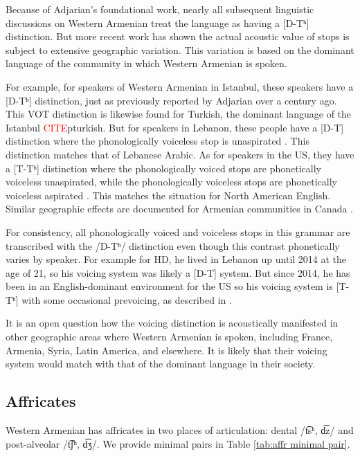 	Because of Adjarian's foundational work, nearly all subsequent linguistic discussions on Western Armenian treat the language as having a [D-Tʰ] distinction. But more recent work has shown the actual acoustic value of stops is subject to extensive geographic variation. This variation is based on the dominant language of the community in which Western Armenian is spoken. 
	
	For example, for speakers of Western Armenian in Istanbul, these speakers have a [D-Tʰ] distinction, just as previously reported by Adjarian over a century ago. This VOT distinction is likewise found for Turkish, the dominant language of the Istanbul \textcolor{red}{CITE}p{turkish}. But for speakers in Lebanon, these people have a [D-T] distinction where the phonologically voiceless stop is unaspirated \citep{kellyKeshishian-2019-voicingStopsAffricatesArmenianLebanon}. This distinction matches that of Lebanese Arabic. As for speakers in the US, they have a [T-Tʰ] distinction where the phonologically voiced stops are phonetically voiceless unaspirated, while the phonologically voiceless stops are phonetically voiceless aspirated \citep{kellyKeshishian-2021-VoicingWesternArmenian}. This matches the situation for North American English. Similar geographic effects are documented for Armenian communities in Canada \citep{Tahtadjian-2021-PhoneticInterferenceProductionStopsWesternArmenianBilingual}. 
	
	For consistency, all phonologically voiced and voiceless stops in this grammar are transcribed with the /D-Tʰ/ distinction even though this contrast phonetically varies by speaker. For example for HD, he lived in Lebanon up until 2014 at the age of 21, so his voicing system was likely a [D-T] system. But since 2014, he has been in an English-dominant environment for the US so his voicing system is [T-Tʰ] with some occasional prevoicing, as described in \citet{Seyfarth-JIPAArmenian}. 
	
	
	It is an open question how the voicing distinction is acoustically manifested in other geographic areas where Western Armenian is spoken, including France, Armenia, Syria, Latin America, and elsewhere. It is likely that their voicing system would match with that of the dominant language in their society.
	\subsection{Affricates}\label{section:segmentalPhono:cons:affr}
	Western Armenian has affricates in two places of articulation: dental /t͡sʰ, d͡z/ and post-alveolar /t͡ʃʰ, d͡ʒ/. We provide minimal pairs in Table \ref{tab:affr minimal pair}. 
	
